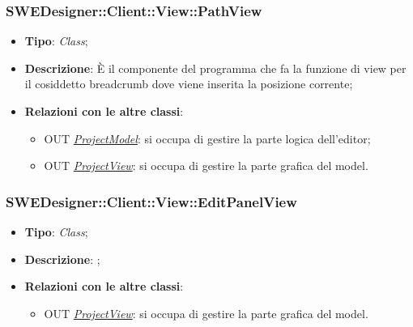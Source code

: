 \documentclass[../SpecificaTecnica.tex]{subfiles}
\begin{document}
				\subsubsection{SWEDesigner::Client::View::PathView}
					\hypertarget{SWEDesigner::Client::View::PathView}{}
					\begin{itemize}
						\item \textbf{Tipo}: \emph{Class};
						\item \textbf{Descrizione}: È il componente del programma che fa la funzione di view per il cosiddetto breadcrumb dove viene inserita la posizione corrente;
						\item \textbf{Relazioni con le altre classi}:
						\begin{itemize}
							\item OUT \hyperlink{SWEDesigner::Model::ProjectModel}{\emph{ProjectModel}}: si occupa di gestire la parte logica dell'editor;
							\item OUT \hyperlink{SWEDesigner::View::ProjectView}{\emph{ProjectView}}: si occupa di gestire la parte grafica del model.
						\end{itemize}
					\end{itemize}

				\subsubsection{SWEDesigner::Client::View::EditPanelView}
					\hypertarget{SWEDesigner::Client::View::EditPanelView}{}
					\begin{itemize}
						\item \textbf{Tipo}: \emph{Class};
						\item \textbf{Descrizione}: ;
						\item \textbf{Relazioni con le altre classi}:
						\begin{itemize}
							\item OUT \hyperlink{SWEDesigner::View::ProjectView}{\emph{ProjectView}}: si occupa di gestire la parte grafica del model.
						\end{itemize}
					\end{itemize}
\end{document}
